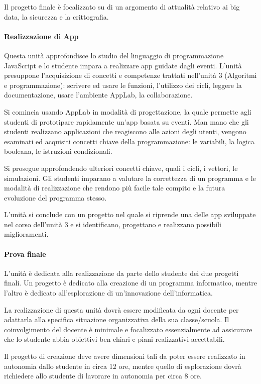 \documentclass[11pt,a4paper]{article}
\begin{document}
Il progetto finale è focalizzato su di un argomento di attualità
relativo ai big data, la sicurezza e la crittografia.

\paragraph{Realizzazione di App}

Questa unità approfondisce lo studio del linguaggio di programmazione
JavaScript e lo studente impara a realizzare app guidate dagli
eventi. L'unità presuppone l'acquisizione di concetti e competenze
trattati nell'unità 3 (Algoritmi e programmazione): scrivere ed usare
le funzioni, l'utilizzo dei cicli, leggere la documentazione, usare
l'ambiente AppLab, la collaborazione.

Si comincia usando AppLab in modalità di progettazione, la quale
permette agli studenti di prototipare rapidamente un'app basata su
eventi. Man mano che gli studenti realizzano applicazioni che
reagiscono alle azioni degli utenti, vengono esaminati ed acquisiti
concetti chiave della programmazione: le variabili, la logica
booleana, le istruzioni condizionali.

Si prosegue approfondendo ulteriori concetti chiave, quali i cicli, i
vettori, le simulazioni. Gli studenti imparano a valutare la
correttezza di un programma e le modalità di realizzazione che rendono
più facile tale compito e la futura evoluzione del programma stesso.

L'unità si conclude con un progetto nel quale si riprende una delle
app sviluppate nel corso dell'unità 3 e si identificano, progettano e
realizzano possibili miglioramenti.

\paragraph{Prova finale}

L'unità è dedicata alla realizzazione da parte dello studente dei due
progetti finali. Un progetto è dedicato alla creazione di un programma
informatico, mentre l'altro è dedicato all'esplorazione di
un'innovazione dell'informatica.

La realizzazione di questa unità dovrà essere modificata da ogni
docente per adattarla alla specifica situazione organizzativa della
sua classe/scuola. Il coinvolgimento del docente è minimale e
focalizzato essenzialmente ad assicurare che lo studente abbia
obiettivi ben chiari e piani realizzativi accettabili.

Il progetto di creazione deve avere dimensioni tali da poter essere
realizzato in autonomia dallo studente in circa 12 ore, mentre quello
di esplorazione dovrà richiedere allo studente di lavorare in
autonomia per circa 8 ore.
\end{document}
